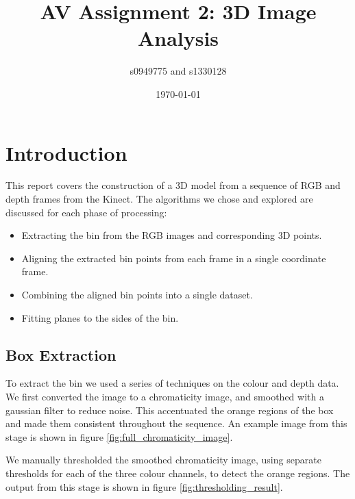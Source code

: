 \documentclass[12pt,a4paper,onecolumn]{article}
\begin{document}
\title{AV Assignment 2: 3D Image Analysis}
\author{s0949775 and s1330128}
\date{\today}
\maketitle


\section{Introduction}
This report covers the construction of a 3D model from a 
sequence of RGB and depth frames from the Kinect. 
The algorithms we chose and explored are discussed for
each phase of processing:
\begin{itemize}
\item Extracting the bin from the RGB images and corresponding 3D points.
\item Aligning the extracted bin points from each frame in a single coordinate frame.
\item Combining the aligned bin points into a single dataset.
\item Fitting planes to the sides of the bin.
\end{itemize}

\subsection{Box Extraction}
To extract the bin we used a series of techniques on the colour and depth data.  We first converted the image to a chromaticity image, and smoothed with a gaussian filter to reduce noise.  This accentuated the orange regions of the box and made them consistent throughout the sequence.  An example image from this stage is shown in figure \ref{fig:full_chromaticity_image}.

We manually thresholded the smoothed chromaticity image, using separate thresholds for each of the three colour channels, to detect the orange regions.  The output from this stage is shown in figure \ref{fig:thresholding_result}.
\end{document}
